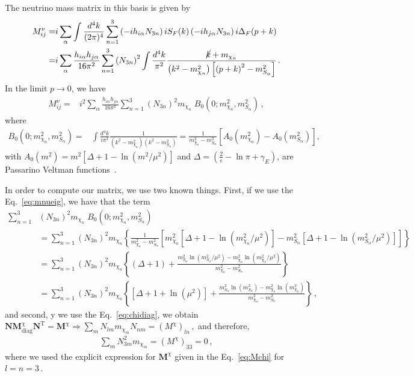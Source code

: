 The neutrino mass matrix in this basis is given by
\begin{align*}
  M^{\nu}_{ij}=&i\sum_{\alpha}\int \frac{d^4k}{(2\pi)^4}\sum_{n=1}^3 \left( -i h_{i\alpha} N_{3n} \right) i S_F(k)\left( -i h_{j\alpha} N_{3n} \right)i\Delta_F(p+k)\nonumber\\
=&i\sum_{\alpha}\frac{h_{i\alpha}h_{j\alpha}}{16\pi^2}\sum_{n=1}^3 \left( N_{3n} \right)^2\int \frac{d^4k}{\pi^2}\frac{\cancel{k}+m_{\chi_n}}{\left(k^2-m_{\chi_n}^2  \right)\left[\left(p+k\right)^2-m_{S_\alpha}^2\right]}\,.
\end{align*}
In the limit $p\to 0$, we have
\begin{align}
\label{eq:mnueig}
  M^{\nu}_{ij}=&i^2\sum_{\alpha}\frac{h_{i\alpha}h_{j\alpha}}{16\pi^2}\sum_{n=1}^3 \left( N_{3n} \right)^2m_{\chi_n}\; B_0 \left(0;m_{\chi_n}^2,m^2_{S_{\alpha}} \right)\,,
\end{align}
where
\begin{align}
B_0 \left(0;m_{\chi_n}^2,m^2_{S_{\alpha}} \right)=&\int \frac{d^4k}{i\pi^2}\frac{1}{\left(k^2-m_{\chi_n}^2\right)\left(k^2-m_{S_\alpha}^2\right)}
=\frac{1}{m_{\chi_n}^2-m_{S_\alpha}^2}\left[ A_0\left(m_{\chi_n}^2\right)-A_0\left(m_{S_\alpha}^2\right)  \right],
\end{align}
with $A_0\left(m^2\right)=m^2 \left[ \Delta+1-\ln \left( m^2/\mu^2 \right) \right]$ and $ \Delta=\left( \frac{2}{\epsilon}-\ln\pi+\gamma_E \right)$, are Passarino Veltman functions~\cite{Passarino:1978jh}. 

In order to compute our matrix, we use two known things. 
First, if we use the Eq.~\eqref{eq:mnueig}, we have that the term
\begin{align}
\label{eq:mnueigdev}
\sum_{n=1}^3& \left( N_{3n} \right)^2m_{\chi_n}\; B_0 \left(0;m_{\chi_n}^2,m^2_{S_\alpha} \right)\nonumber\\
  &=\sum_{n=1}^3 \left( N_{3n} \right)^2m_{\chi_n}
   \left\{\frac{1}{m_{\chi_n}^2-m_{S_\alpha}^2}\left[m^2_{\chi_n} \left[ \Delta+1-\ln \left( m_{\chi_n}^2/\mu^2 \right) \right]   
-m_{S_\alpha}^2 \left[ \Delta+1-\ln \left( m_{S_\alpha}^2/\mu^2 \right) \right]\right] \right\}\nonumber\\
&=\sum_{n=1}^3 \left( N_{3n} \right)^2m_{\chi_n}
   \left\{(\Delta+1)+\frac{m_{S_\alpha}^2\ln \left( m_{S_\alpha}^2/\mu^2 \right)-m_{\chi_n}^2\ln \left( m_{\chi_n}^2/\mu^2 \right)}{m_{\chi_n}^2-m_{S_\alpha}^2} \right\}\nonumber\\
&=\sum_{n=1}^3 \left( N_{3n} \right)^2m_{\chi_n}
   \left\{\left[\Delta+1+\ln\left( \mu^2 \right) \right]+\frac{m_{S_\alpha}^2\ln \left( m_{S_\alpha}^2 \right)-m_{\chi_n}^2\ln \left( m_{\chi_n}^2 \right)}{m_{\chi_n}^2-m_{S_\alpha}^2} \right\}\,,
\end{align}
%
and second, y we use the Eq.~\eqref{eq:chidiag}, we obtain 
$\mathbf{N} \mathbf{M}^\chi_{\text{diag}}\mathbf{N}^{\operatorname{T}}=\mathbf{M}^\chi\Rightarrow \sum_mN_{lm}m_{\chi_m} N_{nm}=(M^\chi)_{ln}\,,$
and therefore,
\begin{align}
\label{eq:divcan}
  \sum_m N_{3m}^2m_{\chi_m}=(M^\chi)_{33}=0\,,
\end{align}
where we used the explicit expression for $\mathbf{M}^{\chi}$ given in the Eq.~\eqref{eq:Mchi} for $l=n=3\,$.
 
